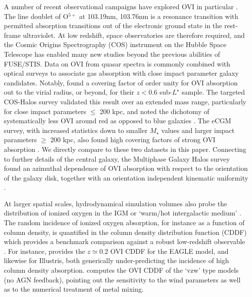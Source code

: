 \documentclass[useAMS,usenatbib]{mnras}
\newcommand{\ovi}{OVI\xspace}
\begin{document}
A number of recent observational campaigns have explored \ovi in particular \citep[reviewed in][]{tumlinson17}. The line doublet of O$^{5+}$ at 103.19nm, 103.76nm is a resonance transition with permitted absorption transitions out of the electronic ground state in the rest-frame ultraviolet. At low redshift, space observatories are therefore required, and the Cosmic Origins Spectrography (COS) instrument on the Hubble Space Telescope has enabled many new studies beyond the previous abilities of FUSE/STIS. Data on \ovi from quasar spectra is commonly combined with optical surveys to associate gas absorption with close impact parameter galaxy candidates. Notably, \cite{prochaska11} found a covering factor of order unity for \ovi absorption out to the virial radius, or beyond, for their $z < 0.6$ sub-$L^\star$ sample. The targeted COS-Halos survey validated this result over an extended mass range, particularly for close impact parameters $\le$ 200 kpc, and noted the dichotomy of systematically less \ovi around red as opposed to blue galaxies \citep{tumlinson11,werk12,werk13}. The eCGM survey, with increased statistics down to smaller $M_\star$ values and larger impact parameters $\ge$ 200 kpc, also found high covering factors of strong \ovi absorption \citep{johnson15a}. We directly compare to these two datasets in this paper. Connecting to further details of the central galaxy, the Multiphase Galaxy Halos survey \citep{kacprzak15} found an azimuthal dependence of \ovi absorption with respect to the orientation of the galaxy disk, together with an orientation independent kinematic uniformity \citep{nielsen17}.

At larger spatial scales, hydrodynamical simulation volumes also probe the distribution of ionized oxygen in the IGM or `warm/hot intergalactic medium' \citep[WHIM;][]{cen99,dave01}. The random incidence of ionized oxygen absorption, for instance as a function of column density, is quantified in the column density distribution function (CDDF) which provides a benchmark comparison against a robust low-redshift observable \citep{danforth08,thom08,tilton12}. For instance, \cite{rahmati16} provides the $z \simeq 0.2$ \ovi CDDF for the EAGLE model, and \cite{suresh15} likewise for Illustris, both generically under-predicting the incidence of high column density absorption. \cite{oppenheimer12} computes the \ovi CDDF of the `vzw' type models (no AGN feedback), pointing out the sensitivity to the wind parameters as well as to the numerical treatment of metal mixing.
\end{document}
